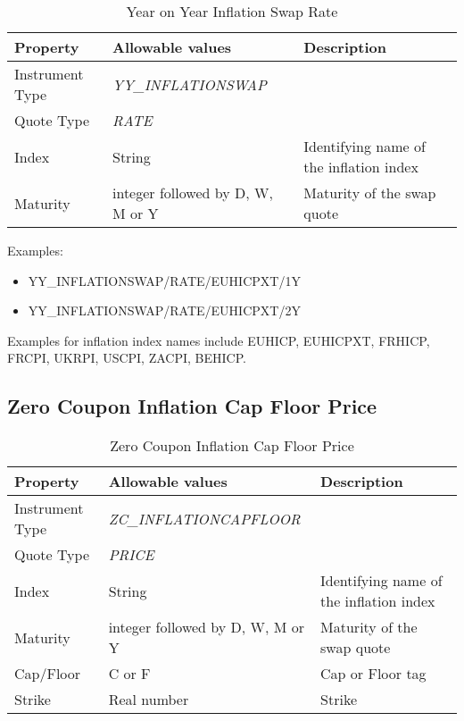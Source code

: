 \begin{table}[H]
    \centering
    \begin{tabular}{|p{3cm}|p{3.5cm}|p{7cm}|}
      \hline
      {\bf Property} & {\bf Allowable values} & {\bf Description} \\ \hline
      Instrument Type & \emph{YY\_INFLATIONSWAP} & \\ \hline
      Quote Type & \emph{RATE} & \\ \hline
      Index & String & Identifying name of the inflation index \\ \hline
      Maturity & integer followed by D, W, M or Y & Maturity of the swap quote \\ \hline
    \end{tabular}
    \caption{Year on Year Inflation Swap Rate}
    \label{tab:yyinflationswap_quote}
\end{table}

\medskip
Examples:
\begin{itemize}
\item {YY\_INFLATIONSWAP/RATE/EUHICPXT/1Y}
\item {YY\_INFLATIONSWAP/RATE/EUHICPXT/2Y}
\end{itemize}

Examples for inflation index names include EUHICP, EUHICPXT, FRHICP, FRCPI, UKRPI, USCPI, ZACPI, BEHICP.

\subsection{Zero Coupon Inflation Cap Floor Price}

\begin{table}[H]
    \centering
    \begin{tabular}{|p{3cm}|p{3.5cm}|p{7cm}|}
      \hline
      {\bf Property} & {\bf Allowable values} & {\bf Description} \\ \hline
      Instrument Type & \emph{ZC\_INFLATIONCAPFLOOR} & \\ \hline
      Quote Type & \emph{PRICE} & \\ \hline
      Index & String & Identifying name of the inflation index \\ \hline
      Maturity & integer followed by D, W, M or Y & Maturity of the swap quote \\ \hline
      Cap/Floor & C or F & Cap or Floor tag \\ \hline
      Strike & Real number & Strike \\ \hline
    \end{tabular}
    \caption{Zero Coupon Inflation Cap Floor Price}
    \label{tab:zcinflationcapfloorprice_quote}
\end{table}

